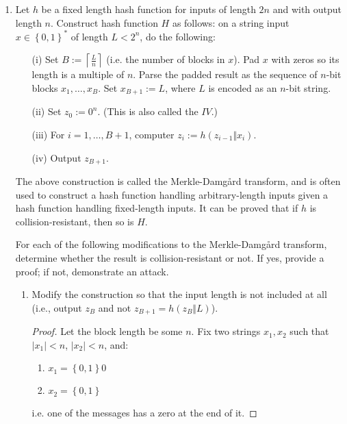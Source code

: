 \documentclass{article}
\begin{document}
\begin{enumerate}
  \item Let $h$ be a fixed length hash function for inputs of length $2n$ and
    with output length $n$. Construct hash function $H$ as follows: on a string
    input $x \in \left\{0, 1\right\}^*$ of length $L < 2^n$, do the following:
    \begin{enumerate}
      \item[(i)] Set $B := \left\lceil\frac{L}{n}\right\rceil$ (i.e. the number of
        blocks in $x$). Pad $x$ with zeros so its length is a multiple of $n$.
        Parse the padded result as the sequence of $n$-bit blocks $x_1, \dots,
        x_B$. Set $x_{B+1} := L$, where $L$ is encoded as an $n$-bit string.
      \item[(ii)] Set $z_0 := 0^n$. (This is also called the $IV$.)
      \item[(iii)] For $i = 1, \dots, B + 1$, computer $z_i := h(z_{i - 1} \Vert x_i)$.
      \item[(iv)] Output $z_{B + 1}$.
    \end{enumerate}

    The above construction is called the Merkle-Damg\aa rd transform, and is
    often used to construct a hash function handling arbitrary-length inputs
    given a hash function handling fixed-length inputs. It can be proved that
    if $h$ is collision-resistant, then so is $H$.

    For each of the following modifications to the Merkle-Damg\aa rd transform,
    determine whether the result is collision-resistant or not. If yes, provide
    a proof; if not, demonstrate an attack.

    \begin{enumerate}
      \item Modify the construction so that the input length is not included at
        all (i.e., output $z_B$ and not $z_{B + 1} = h(z_B \Vert L)$).

        \begin{proof}
          Let the block length be some $n$. Fix two strings $x_1, x_2$ such
          that $|x_1| < n$, $|x_2| < n$, and:
          \begin{enumerate}
            \item $x_1 = \left\{0, 1\right\} 0$
            \item $x_2 = \left\{0, 1\right\}$
          \end{enumerate}

          i.e. one of the messages has a zero at the end of it.


\end{proof}
\end{enumerate}
\end{enumerate}
\end{document}
